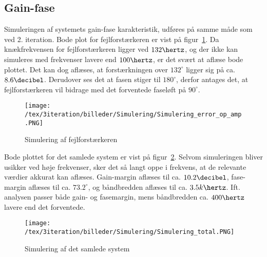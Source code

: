 
\subsection{Gain-fase}
Simuleringen af systemets gain-fase karakteristik, udføres på samme måde som ved 2. iteration. Bode plot for fejlforstærkeren er vist på figur~\ref{fig:Simulering_error_op_amp_3}. Da knækfrekvensen for fejlforstærkeren ligger ved $132\hertz$, og der ikke kan simuleres med frekvenser lavere end $100\hertz$, er det svært at aflæse bode plottet. Det kan dog aflæses, at forstærkningen over $132^\circ$ ligger sig på ca. $8.6\decibel$. Derudover ses det at fasen stiger til $180^\circ$, derfor antages det, at fejlforstærkeren vil bidrage med det forventede faseløft på $90^\circ$. 

\begin{figure}[H]
	\center
	\texttt{[image: /tex/3iteration/billeder/Simulering/Simulering\_error\_op\_amp.PNG]}
	\caption{Simulering af fejlforstærkeren}
	\label{fig:Simulering_error_op_amp_3}
\end{figure}

Bode plottet for det samlede system er vist på figur~\ref{fig:Simulering_total_3}. Selvom simuleringen bliver usikker ved høje frekvenser, sker det så langt oppe i frekvens, at de relevante værdier akkurat kan aflæses. Gain-margin aflæses til ca. $10.2\decibel$, fase-margin aflæses til ca. $73.2^\circ$, og båndbredden aflæses til ca. $3.5k\hertz$. Ift. analysen passer både gain- og fasemargin, mens båndbredden ca. $400\hertz$ lavere end det forventede. 

\begin{figure}[H]
	\center
	\texttt{[image: /tex/3iteration/billeder/Simulering/Simulering\_total.PNG]}
	\caption{Simulering af det samlede system}
	\label{fig:Simulering_total_3}
\end{figure}